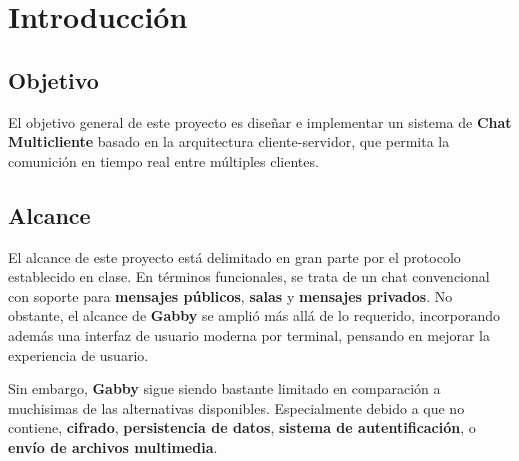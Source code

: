 \section{Introducción}

\subsection*{Objetivo}
El objetivo general de este proyecto es diseñar e implementar un sistema de 
\textbf{Chat Multicliente} basado en la arquitectura cliente-servidor, que permita
la comunición en tiempo real entre múltiples clientes.

\subsection*{Alcance}

El alcance de este proyecto está delimitado en gran parte por el protocolo
establecido en clase. En términos funcionales, se trata de un chat
convencional con soporte para \textbf{mensajes públicos}, \textbf{salas} y
\textbf{mensajes privados}. No obstante, el alcance de \textbf{Gabby} se
amplió más allá de lo requerido, incorporando además una interfaz de
usuario moderna por terminal, pensando en mejorar la experiencia de usuario.


Sin embargo, \textbf{Gabby} sigue siendo bastante limitado en comparación a muchisimas 
de las alternativas disponibles. Especialmente debido a que no contiene, \textbf{cifrado}, 
\textbf{persistencia de datos}, \textbf{sistema de autentificación}, o \textbf{envío de archivos multimedia}.